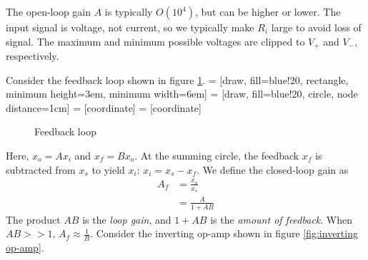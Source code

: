 \documentclass[nobib]{tufte-handout}
\begin{document}
The open-loop gain $A$ is typically $O(10^4)$, but 
can be higher or lower. The input signal 
is voltage, not current, so we typically 
make $R_i$ large to avoid loss of signal. 
The maximum and minimum possible voltages 
are clipped to $V_+$ and $V_-$, respectively. 

Consider the feedback loop 
shown in figure \ref{fig:feedback loop}.
 = [draw, fill=blue!20, rectangle, 
    minimum height=3em, minimum width=6em]
 = [draw, fill=blue!20, circle, node distance=1cm]
 = [coordinate]
 = [coordinate]
\begin{figure}
    \begin{center}
    \end{center}
    \caption{Feedback loop}
    \label{fig:feedback loop}
\end{figure}
Here, $x_o = Ax_i$ and $x_f = Bx_o$. At the 
summing circle, the feedback $x_f$ is subtracted 
from $x_s$ to yield $x_i$: $x_i = x_s - x_f$. 
We define the closed-loop gain as 
\begin{align} \label{eq:38}
    A_f &= \frac{x_o}{x_s} \\
    &= \frac{A}{1+AB}
\end{align}
The product $AB$ is the \emph{loop gain}, 
and $1 + AB$ is the \emph{amount of feedback}.
When $AB >> 1$, $A_f \approx \frac{1}{B}$. 
Consider the inverting op-amp shown in figure 
\ref{fig:inverting op-amp}.
\end{document}
